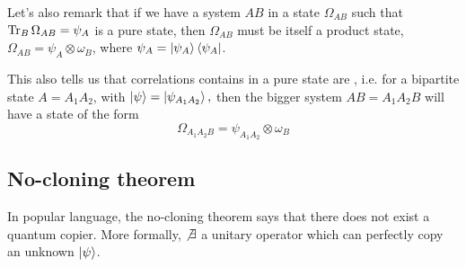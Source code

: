 Let's also remark that if we have a system $AB$ in a state $\Omega_{AB}$ such that $\operatorname{Tr}_B \Omega_{AB}=\psi_A$ is a pure state, then $\Omega_{AB}$ must be itself a product state, $\Omega_{AB}=\psi_A \otimes \omega_B$, where $\psi_A=\left| \psi_A \right>\left< \psi_A \right|$.

This also tells us that correlations contains in a pure state are , i.e. for a bipartite state $A=A_1 A_2$, with $\left| \psi \right>=\left| \psi_{A_1A_2} \right>,$ then the bigger system $AB=A_1 A_2 B$ will have a state of the form
\begin{equation}
    \Omega_{A_1A_2B} = \psi_{A_1A_2} \otimes \omega_B
\end{equation}
\subsection*{No-cloning theorem} In popular language, the no-cloning theorem says that there does not exist a quantum copier. More formally, $\not\exists$ a unitary operator which can perfectly copy an unknown $\left| \psi \right>$.

